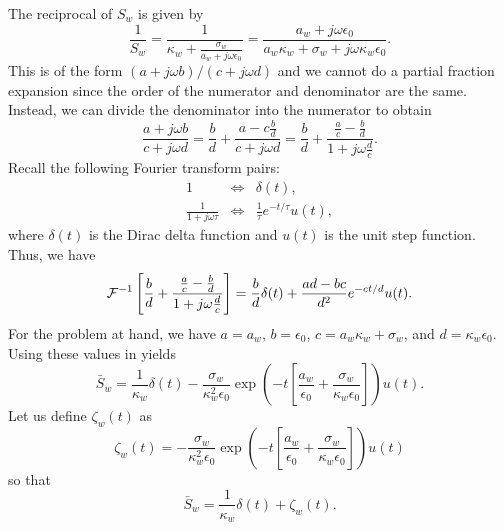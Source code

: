 The reciprocal of $S_w$ is given by
\begin{equation}
  \frac{1}{S_w} = 
  \frac{1}{\kappa_w + \frac{\sigma_w}{a_w + j\omega\epsilon_0}} =
  \frac{a_w + j\omega\epsilon_0}
       {a_w\kappa_w + \sigma_w + j\omega\kappa_w\epsilon_0}.
\end{equation}
This is of the form $(a+j\omega b)/(c+j\omega d)$ and we cannot do a
partial fraction expansion since the order of the numerator and
denominator are the same.  Instead, we can divide the denominator into
the numerator to obtain
\begin{equation}
  \frac{a+j\omega b}{c+j\omega d} =
   \frac{b}{d} +
   \frac{a-c\frac{b}{d}}{c+j\omega d}
   =  
   \frac{b}{d} +
   \frac{\frac{a}{c}-\frac{b}{d}}{1+j\omega\frac{d}{c}}.
\end{equation}
Recall the following Fourier transform pairs:
\begin{eqnarray}
  1 &\Leftrightarrow& \delta(t), \\
  \frac{1}{1+j\omega\tau} &\Leftrightarrow&
    \frac{1}{\tau} e^{-t/\tau} u(t),
\end{eqnarray}
where $\delta(t)$ is the Dirac delta function and $u(t)$ is the unit
step function.  Thus, we have
\begin{equation}
  {\cal F}^{-1}\left[\frac{b}{d} +
     \frac{\frac{a}{c}-\frac{b}{d}}{1+j\omega\frac{d}{c}}\right] =
  \frac{b}{d}\delta(t) + \frac{ad-bc}{d^2}e^{-ct/d} u(t).
  \label{eq:fourierDetail}
\end{equation}
For the problem at hand, we have $a=a_w$, $b=\epsilon_0$,
$c=a_w\kappa_w+\sigma_w$, and $d=\kappa_w\epsilon_0$.  Using these
values in  yields
\begin{equation}
  \bar{S}_w = 
  \frac{1}{\kappa_w}\delta(t) -
  \frac{\sigma_w}{\kappa_w^2\epsilon_0}
   \exp\!\left(-t\left[\frac{a_w}{\epsilon_0}+
                       \frac{\sigma_w}{\kappa_w\epsilon_0}\right]\right) u(t).
  \label{eq:sBarTime}
\end{equation}
Let us define $\zeta_w(t)$ as
\begin{equation}
  \zeta_w(t) = -\frac{\sigma_w}{\kappa_w^2\epsilon_0}
   \exp\!\left(-t\left[\frac{a_w}{\epsilon_0}+
                       \frac{\sigma_w}{\kappa_w\epsilon_0}\right]\right) u(t)
\end{equation}
so that
\begin{equation}
  \bar{S}_w = 
  \frac{1}{\kappa_w}\delta(t) + \zeta_w(t).
\end{equation}

